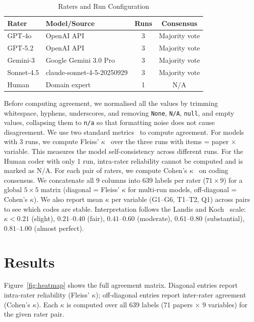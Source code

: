 \documentclass[conference,compsoc]{IEEEtran}
\begin{document}
\begin{table}[h]
\centering
\caption{Raters and Run Configuration}
\label{tab:raters}
\small
\begin{tabular}{@{}llcc@{}}
\toprule
\textbf{Rater} & \textbf{Model/Source} & \textbf{Runs} & \textbf{Consensus} \\
\midrule
GPT-4o & OpenAI API & 3 & Majority vote \\
GPT-5.2 & OpenAI API & 3 & Majority vote \\
Gemini-3 & Google Gemini 3.0 Pro & 3 & Majority vote \\
Sonnet-4.5 & claude-sonnet-4-5-20250929 & 3 & Majority vote \\
Human & Domain expert & 1 & N/A \\
\bottomrule
\end{tabular}
\end{table}

Before computing agreement, we normalised all the values by trimming whitespace, hyphens, underscores, and removing \texttt{None}, \texttt{N/A}, \texttt{null}, and empty values, collapsing them to \texttt{n/a} so that formatting noise does not cause disagreement. We use two standard metrics~\cite{krippendorff2004reliability,neuendorf2017content} to compute agreement. For models with 3 runs, we compute Fleiss' $\kappa$~\cite{fleiss1971measuring} over the three runs with items = paper $\times$ variable. This measures the model self-consistency across different runs. For the Human coder with only 1 run, intra-rater reliability cannot be computed and is marked as N/A. For each pair of raters, we compute Cohen's $\kappa$~\cite{cohen1960coefficient} on coding consensus. We concatenate all 9 columns into 639 labels per rater ($71 \times 9$) for a global $5 \times 5$ matrix (diagonal = Fleiss' $\kappa$ for multi-run models, off-diagonal = Cohen's $\kappa$). We also report mean $\kappa$ per variable (G1--G6, T1--T2, Q1) across pairs to see which codes are stable. Interpretation follows the Landis and Koch~\cite{landis1977measurement} scale: $\kappa < 0.21$ (slight), $0.21$--$0.40$ (fair), $0.41$--$0.60$ (moderate), $0.61$--$0.80$ (substantial), $0.81$--$1.00$ (almost perfect).

\section{Results}

Figure~\ref{fig:heatmap} shows the full agreement matrix. Diagonal entries report intra-rater reliability (Fleiss' $\kappa$); off-diagonal entries report inter-rater agreement (Cohen's $\kappa$). Each $\kappa$ is computed over all 639 labels (71 papers $\times$ 9 variables) for the given rater pair.
\end{document}
